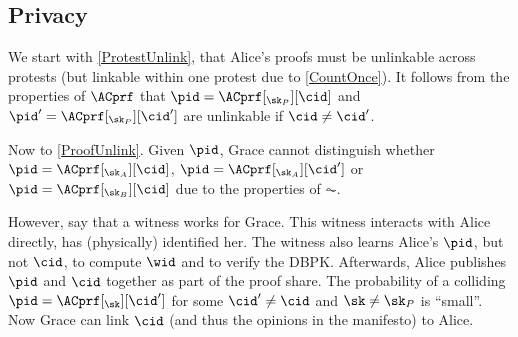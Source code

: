%
%

\subsection{Privacy}

We start with \cref{ProtestUnlink}, that Alice's proofs must be unlinkable 
across protests (but linkable within one protest due to \cref{CountOnce}).
It follows from the properties of \(\ACprf\) that \(\pid = 
  \ACprf[_{\sk_P}][\cid]\) and \(\pid' = \ACprf[_{\sk_P}][\cid']\) are 
unlinkable if \(\cid\neq \cid'\).

Now to \cref{ProofUnlink}.
Given \(\pid\), Grace cannot distinguish whether \(\pid = 
  \ACprf[_{\sk_A}][\cid]\), \(\pid = \ACprf[_{\sk_A}][\cid']\) or \(\pid = 
  \ACprf[_{\sk_B}][\cid]\) due to the properties of \(\AC\).

However, say that a witness works for Grace.
This witness interacts with Alice directly, \ie has (physically) identified her.
The witness also learns Alice's \(\pid\), but not \(\cid\), to compute \(\wid\) 
and to verify the \ac{DBPK}.
Afterwards, Alice publishes \(\pid\) and \(\cid\) together as part of the proof 
share.
The probability of a colliding \(\pid = \ACprf[_\sk][\cid']\) for some \(\cid' 
  \neq \cid\) and \(\sk \neq \sk_P\) is \enquote{small}.
Now Grace can link \(\cid\) (and thus the opinions in the manifesto) to Alice.
